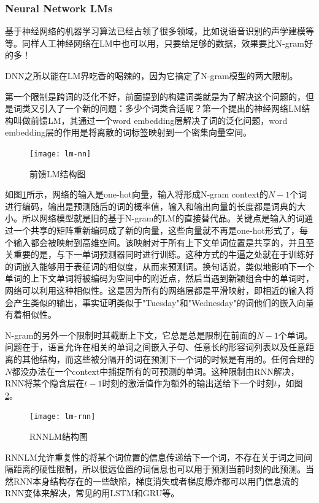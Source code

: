 \subsubsection{Neural Network LMs}
基于神经网络的机器学习算法已经占领了很多领域，比如说语音识别的声学建模等等。同样人工神经网络在LM中也可以用，只要给足够的数据，效果要比N-gram好的多！

DNN之所以能在LM界吃香的喝辣的，因为它搞定了N-gram模型的两大限制。

第一个限制是跨词的泛化不好，前面提到的构建词类就是为了解决这个问题的，但是词类又引入了一个新的问题：多少个词类合适呢？第一个提出的神经网络LM结构叫做前馈LM，其通过一个word embedding层解决了词的泛化问题，word embedding层的作用是将离散的词标签映射到一个密集向量空间。
\begin{figure}[htbp]
	\centering
	\texttt{[image: lm-nn]}
	\caption{前馈LM结构图\label{fig:lm-nn}}
\end{figure}

如图\ref{fig:lm-nn}所示，网络的输入是one-hot向量，输入将形成N-gram context的$N-1$个词进行编码，输出是预测随后的词的概率值，输入和输出向量的长度都是词典的大小。所以网络模型就是旧的基于N-gram的LM的直接替代品。关键点是输入的词通过一个共享的矩阵重新编码成了新的向量，这些向量就不再是one-hot形式了，每个输入都会被映射到高维空间。该映射对于所有上下文单词位置是共享的，并且至关重要的是，与下一单词预测器同时进行训练。这种方式的牛逼之处就在于训练好的词嵌入能够用于表征词的相似度，从而来预测词。换句话说，类似地影响下一个单词的上下文单词将被编码为空间中的附近点，然后当遇到新颖组合中的单词时，网络可以利用这种相似性。这是因为所有的网络层都是平滑映射，即相近的输入将会产生类似的输出，事实证明类似于"Tuesday"和"Wednesday"的词他们的嵌入向量有着相似性。

N-gram的另外一个限制时其截断上下文，它总是总是限制在前面的$N-1$个单词。问题在于，语言允许在相关的单词之间嵌入子句、任意长的形容词列表以及任意距离的其他结构，而这些被分隔开的词在预测下一个词的时候是有用的。任何合理的$N$都没办法在一个context中捕捉所有的可预测的单词。这种限制由RNN解决，RNN将某个隐含层在$t-1$时刻的激活值作为额外的输出送给下一个时刻$t$，如图\ref{fig:lm-rnn}。
\begin{figure}[htbp]
	\centering
	\texttt{[image: lm-rnn]}
	\caption{RNNLM结构图\label{fig:lm-rnn}}
\end{figure}

RNNLM允许重复性的将某个词位置的信息传递给下一个词，不存在关于词之间间隔距离的硬性限制，所以很远位置的词信息也可以用于预测当前时刻的此预测。当然RNN本身结构存在的一些缺陷，梯度消失或者梯度爆炸都可以用门信息流的RNN变体来解决，常见的用LSTM和GRU等。

